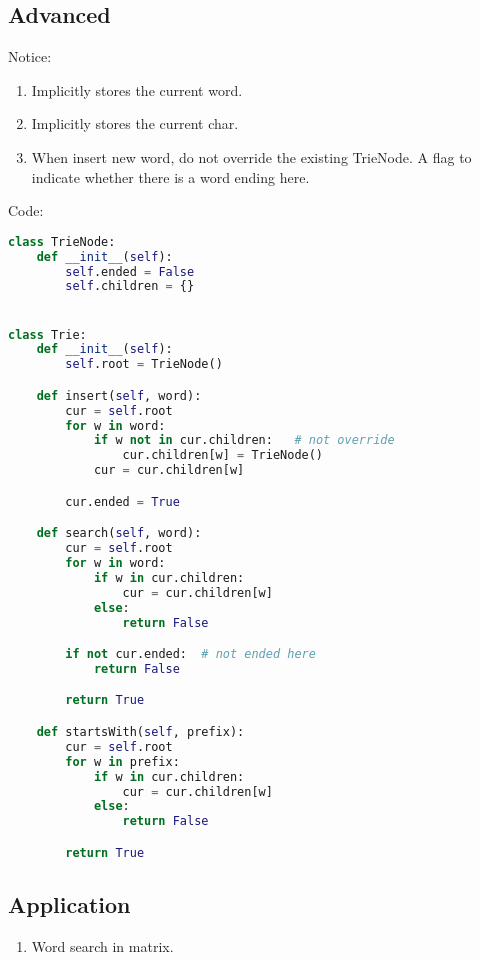 \subsection{Advanced}
Notice:
\begin{enumerate}
\item Implicitly stores the current word. 
\item Implicitly stores the current char. 
\item When insert new word, do not override the existing TrieNode. A flag to indicate whether there is a word ending here.
\end{enumerate}
Code:
\begin{lstlisting}[language=python]
class TrieNode:
    def __init__(self):
        self.ended = False
        self.children = {}


class Trie:
    def __init__(self):
        self.root = TrieNode()

    def insert(self, word):
        cur = self.root
        for w in word:
            if w not in cur.children:   # not override
                cur.children[w] = TrieNode()
            cur = cur.children[w]

        cur.ended = True

    def search(self, word):
        cur = self.root
        for w in word:
            if w in cur.children:
                cur = cur.children[w]
            else:
                return False

        if not cur.ended:  # not ended here
            return False

        return True

    def startsWith(self, prefix):
        cur = self.root
        for w in prefix:
            if w in cur.children:
                cur = cur.children[w]
            else:
                return False

        return True
\end{lstlisting}
\subsection{Application}
\begin{enumerate}
\item Word search in matrix. 
\end{enumerate}


